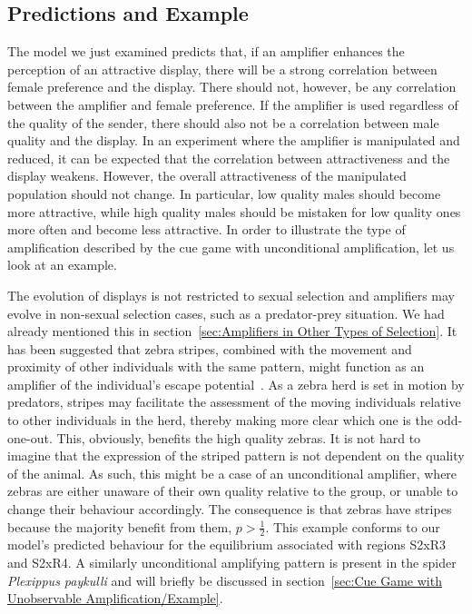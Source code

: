\documentclass[a4paper,12pt]{article}
\numberwithin{equation}{section}
\begin{document}
\subsection{Predictions and Example}
\label{sec:Cue Game with Unconditional Amplification/Example}

The model we just examined predicts that, if an amplifier enhances the perception of an attractive display, there will be a strong correlation between female preference and the display. There should not, however, be any correlation between the amplifier and female preference. If the amplifier is used regardless of the quality of the sender, there should also not be a correlation between male quality and the display. In an experiment where the amplifier is manipulated and reduced, it can be expected that the correlation between attractiveness and the display weakens. However, the overall attractiveness of the manipulated population should not change. In particular, low quality males should become more attractive, while high quality males should be mistaken for low quality ones more often and become less attractive. In order to illustrate the type of amplification described by the cue game with unconditional amplification, let us look at an example.

The evolution of displays is not restricted to sexual selection and amplifiers may evolve in non-sexual selection cases, such as a predator-prey situation. We had already mentioned this in section~\ref{sec:Amplifiers in Other Types of Selection}. It has been suggested that zebra stripes, combined with the movement and proximity of other individuals with the same pattern, might function as an amplifier of the individual's escape potential~\cite{Ljetoff2007}. As a zebra herd is set in motion by predators, stripes may facilitate the assessment of the moving individuals relative to other individuals in the herd, thereby making more clear which one is the odd-one-out. This, obviously, benefits the high quality zebras. It is not hard to imagine that the expression of the striped pattern is not dependent on the quality of the animal. As such, this might be a case of an unconditional amplifier, where zebras are either unaware of their own quality relative to the group, or unable to change their behaviour accordingly. The consequence is that zebras have stripes because the majority benefit from them, $p>\frac{1}{2}$. This example conforms to our model's predicted behaviour for the equilibrium associated with regions S2xR3 and S2xR4. A similarly unconditional amplifying pattern is present in the spider \textit{Plexippus paykulli} and will briefly be discussed in section~\ref{sec:Cue Game with Unobservable Amplification/Example}.
\end{document}
